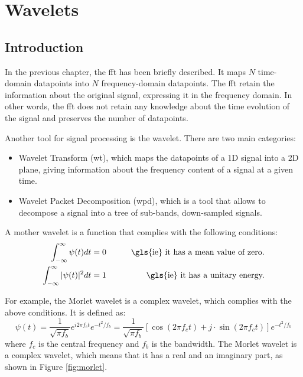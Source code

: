 \chapter{Wavelets}
\label{app:wavelet}

\section{Introduction}
In the previous chapter, the \gls{fft} has been briefly described. It maps $N$ time-domain datapoints into $N$ frequency-domain datapoints. The \gls{fft} retain the information about the original signal, expressing it in the frequency domain. In other words, the \gls{fft} does not retain any knowledge about the time evolution of the signal and preserves the number of datapoints.

Another tool for signal processing is the wavelet. There are two main categories:
\begin{itemize}
\item  Wavelet Transform (\gls{wt}), which maps the datapoints of a 1D signal into a 2D plane, giving information about the frequency content of a signal at a given time.
\item Wavelet Packet Decomposition (\gls{wpd}), which is a tool that allows to decompose a signal into a tree of sub-bands, down-sampled signals. 
\end{itemize}

A mother wavelet is a function that complies with the following conditions:
\begin{align}
\int_{-\infty}^{\infty} \psi(t) dt = 0 & \qquad &\text{\gls{ie} it has a mean value of zero.} \\
\int_{-\infty}^{\infty} |\psi(t)|^2 dt = 1 & \qquad &\text{\gls{ie} it has a unitary energy.}
\end{align}

For example, the Morlet wavelet is a complex wavelet, which complies with the above conditions. It is defined as:
\begin{equation}
\psi(t) = \frac{1}{\sqrt{\pi f_b}} e^{i 2 \pi f_c t} e^{-t^2/f_b} =  \frac{1}{\sqrt{\pi f_b}}[ \cos(2 \pi f_c t) + j\cdot \sin(2 \pi f_c t)] e^{-t^2/f_b}
\end{equation}
where $f_c$ is the central frequency and $f_b$ is the bandwidth. The Morlet wavelet is a complex wavelet, which means that it has a real and an imaginary part, as shown in Figure \ref{fig:morlet}. 


